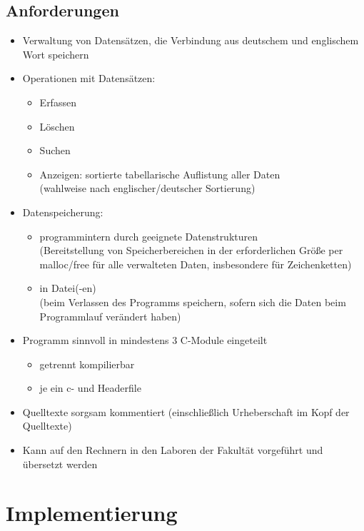 \subsection{Anforderungen}
\begin{itemize}
	\item Verwaltung von Datensätzen, die Verbindung aus deutschem und englischem Wort speichern
	
	\item Operationen mit Datensätzen:
	\begin{itemize}
		\item Erfassen
		\item Löschen
		\item Suchen
		\item Anzeigen: sortierte tabellarische Auflistung aller Daten \\
		(wahlweise nach englischer/deutscher Sortierung)
	\end{itemize}
	
	\item Datenspeicherung:
	\begin{itemize}
		\item programmintern durch geeignete Datenstrukturen \\
		(Bereitstellung von Speicherbereichen in der erforderlichen Größe per malloc/free für alle verwalteten Daten, insbesondere für Zeichenketten)
		
		\item in Datei(-en) \\
		(beim Verlassen des Programms speichern, sofern sich die Daten beim Programmlauf verändert haben)
	\end{itemize}
	
	\item Programm sinnvoll in mindestens 3 C-Module eingeteilt
	\begin{itemize}
		\item getrennt kompilierbar
		\item je ein c- und Headerfile
	\end{itemize}
	
	\item Quelltexte sorgsam kommentiert (einschließlich Urheberschaft im Kopf der Quelltexte)
	
	\item Kann auf den Rechnern in den Laboren der Fakultät vorgeführt und übersetzt werden
\end{itemize}

\section{Implementierung}

